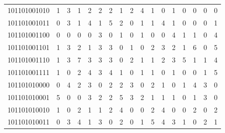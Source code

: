 \documentclass[10pt,a4paper]{article}
\begin{document}
\begin{longtable}{ |c|c|c|c|c|c|c|c|c|c|c|c|c|c|c|c|c| }
    101101001010              & 1                            & 3                                & 1                            & 2                              & 2   & 2   & 1   & 2   & 4   & 1   & 0   & 1   & 0   & 0   & 0   & 0   \\
    101101001011              & 0                            & 3                                & 1                            & 4                              & 1   & 5   & 2   & 0   & 1   & 1   & 4   & 1   & 0   & 0   & 0   & 1   \\
    101101001100              & 0                            & 0                                & 0                            & 0                              & 3   & 0   & 1   & 0   & 1   & 0   & 0   & 4   & 1   & 1   & 0   & 4   \\
    101101001101              & 1                            & 3                                & 2                            & 1                              & 3   & 3   & 0   & 1   & 0   & 2   & 3   & 2   & 1   & 6   & 0   & 5   \\
    101101001110              & 1                            & 3                                & 7                            & 3                              & 3   & 3   & 0   & 2   & 1   & 1   & 2   & 3   & 5   & 1   & 1   & 4   \\
    101101001111              & 1                            & 0                                & 2                            & 4                              & 3   & 4   & 1   & 0   & 1   & 1   & 0   & 1   & 0   & 0   & 1   & 5   \\
    101101010000              & 0                            & 4                                & 2                            & 3                              & 0   & 2   & 2   & 3   & 0   & 2   & 1   & 0   & 1   & 4   & 3   & 0   \\
    101101010001              & 5                            & 0                                & 0                            & 3                              & 2   & 2   & 5   & 3   & 2   & 1   & 1   & 1   & 0   & 1   & 3   & 0   \\
    101101010010              & 1                            & 0                                & 2                            & 1                              & 1   & 2   & 4   & 0   & 0   & 2   & 4   & 0   & 0   & 2   & 0   & 2   \\
    101101010011              & 0                            & 3                                & 4                            & 1                              & 3   & 0   & 2   & 0   & 1   & 5   & 4   & 3   & 1   & 0   & 2   & 1   \\

\end{longtable}
\end{document}
